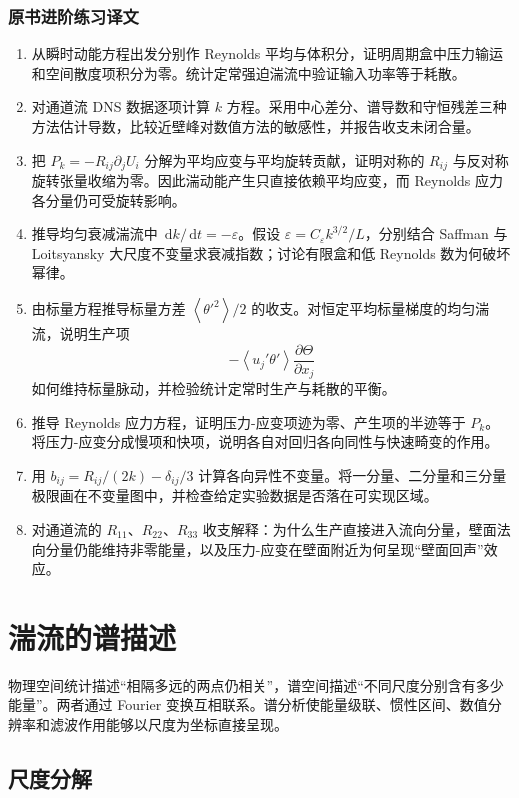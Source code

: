 \documentclass[12pt,a4paper,openany,fontset=none]{ctexbook}
\newcommand{\dd}{\,\mathrm d}
\newcommand{\avg}[1]{\left\langle #1\right\rangle}
\begin{document}
\subsection*{原书进阶练习译文}
\begin{enumerate}[label=\arabic*.]
 \item 从瞬时动能方程出发分别作 Reynolds 平均与体积分，证明周期盒中压力输运和空间散度项积分为零。统计定常强迫湍流中验证输入功率等于耗散。
 \item 对通道流 DNS 数据逐项计算 $k$ 方程。采用中心差分、谱导数和守恒残差三种方法估计导数，比较近壁峰对数值方法的敏感性，并报告收支未闭合量。
 \item 把 $P_k=-R_{ij}\partial_jU_i$ 分解为平均应变与平均旋转贡献，证明对称的 $R_{ij}$ 与反对称旋转张量收缩为零。因此湍动能产生只直接依赖平均应变，而 Reynolds 应力各分量仍可受旋转影响。
 \item 推导均匀衰减湍流中 $\dd k/\dd t=-\varepsilon$。假设 $\varepsilon=C_\varepsilon k^{3/2}/L$，分别结合 Saffman 与 Loitsyansky 大尺度不变量求衰减指数；讨论有限盒和低 Reynolds 数为何破坏幂律。
 \item 由标量方程推导标量方差 $\avg{\theta'^2}/2$ 的收支。对恒定平均标量梯度的均匀湍流，说明生产项
 \begin{equation*}-\avg{u_j'\theta'}\frac{\partial\Theta}{\partial x_j}\end{equation*}
 如何维持标量脉动，并检验统计定常时生产与耗散的平衡。
 \item 推导 Reynolds 应力方程，证明压力-应变项迹为零、产生项的半迹等于 $P_k$。将压力-应变分成慢项和快项，说明各自对回归各向同性与快速畸变的作用。
 \item 用 $b_{ij}=R_{ij}/(2k)-\delta_{ij}/3$ 计算各向异性不变量。将一分量、二分量和三分量极限画在不变量图中，并检查给定实验数据是否落在可实现区域。
 \item 对通道流的 $R_{11}$、$R_{22}$、$R_{33}$ 收支解释：为什么生产直接进入流向分量，壁面法向分量仍能维持非零能量，以及压力-应变在壁面附近为何呈现“壁面回声”效应。
\end{enumerate}
\chapter{湍流的谱描述}

物理空间统计描述“相隔多远的两点仍相关”，谱空间描述“不同尺度分别含有多少能量”。两者通过 Fourier 变换互相联系。谱分析使能量级联、惯性区间、数值分辨率和滤波作用能够以尺度为坐标直接呈现。

\section{尺度分解}
\end{document}
